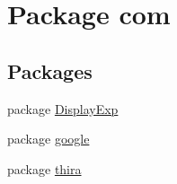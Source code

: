 \hypertarget{namespacecom}{\section{Package com}
\label{namespacecom}
}
\subsection*{Packages}
\begin{DoxyCompactItemize}
\item 
package \hyperlink{namespacecom_1_1_display_exp}{Display\-Exp}
\item 
package \hyperlink{namespacecom_1_1google}{google}
\item 
package \hyperlink{namespacecom_1_1thira}{thira}
\end{DoxyCompactItemize}
